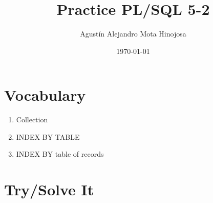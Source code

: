 \documentclass[11pt]{article}
\author{Agustín Alejandro Mota Hinojosa}
\date{\today}
\title{Practice PL/SQL 5-2}
\begin{document}
\maketitle
\tableofcontents

\section{Vocabulary}
\label{sec:orgb8fa6ff}
\begin{enumerate}
\item Collection
\item INDEX BY TABLE
\item INDEX BY table of records
\end{enumerate}
\section{Try/Solve It}
\label{sec:orgb6d28a8}
\end{document}
